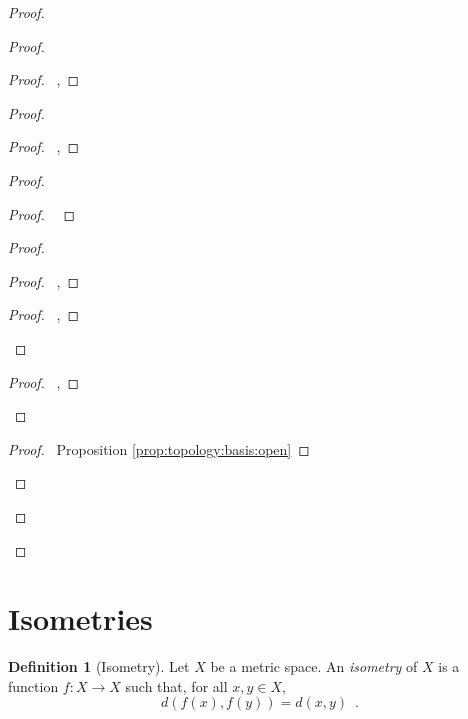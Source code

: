 \documentclass{report}
\let\qed\relax
\theoremstyle{definition}
\newtheorem{df}[lm]{Definition}
\begin{document}
\begin{proof}
\begin{proof}
    \begin{proof}
      \pf\ , 
    \end{proof}
    \begin{proof}
      \begin{proof}
        \pf\ , 
      \end{proof}
      \begin{proof}
        \begin{proof}
          \pf\ 
        \end{proof}
        \begin{proof}
          \begin{proof}
            \pf\ , 
          \end{proof}
          \qedstep
          \begin{proof}
            \pf\ , 
          \end{proof}
        \end{proof}
        \begin{proof}
          \pf\ , 
        \end{proof}
      \end{proof}
      \qedstep
      \begin{proof}
        \pf\ Proposition \ref{prop:topology:basis:open}
      \end{proof}
    \end{proof}
  \end{proof}
  \qed
\end{proof}

  \section{Isometries}

  \begin{df}[Isometry]
    Let $X$ be a metric space. An \emph{isometry} of $X$ is a function $f : X
    \rightarrow X$ such that, for all $x, y \in X$,
    \[ d(f(x), f(y)) = d(x, y) \enspace . \]
  \end{df}
\end{document}
